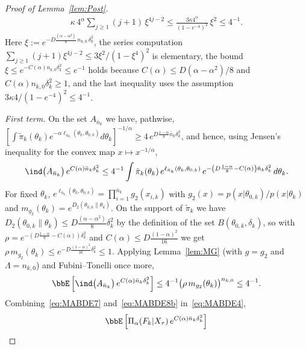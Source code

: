 \documentclass[11pt]{article}
\begin{document}
\begin{proof}[Proof of Lemma~\ref{lem:Post}]
\begin{align}
    \kappa\, 4^{\alpha}\sum_{j\geq 1} (j+1)\, \xi^{4j-2} \leq \frac{3\kappa 4^{\alpha}}{(1-e^{-4})^2}\, \xi^{2} \leq 4^{-1}.
    \label{eq:MABDE7}
\end{align}
Here $\xi := e^{-D \frac{(\alpha-\alpha^2)}{8}\, n_{k,0}\, \delta_k^2 }$, the series computation $\sum_{j\geq 1}(j+1)\xi^{4j-2} \leq 3 \xi^2/(1-\xi^4)^2$ is elementary, the bound $\xi \leq e^{-C(\alpha) n_{k,0} \delta_k^2} \leq e^{-1}$ holds because $C(\alpha) \leq D(\alpha-\alpha^2)/8$ and $C(\alpha) n_{k,0} \delta_k^2 \geq 1$, and the last inequality uses the assumption $3\kappa 4/(1-e^{-4})^2 \leq 4^{-1}$.

\emph{First term.} On the set $A_{\bar n_k}$ we have, pathwise, $\left[ \int \tilde \pi_k(\theta_k) e^{-\alpha \ell_{\bar n_k}(\theta_k,\theta_{0,k})} d\theta_k \right]^{-1/\alpha} \geq 4\, e^{ D \frac{1-\alpha}{8} \bar n_k \delta_k^2 }$, and hence, using Jensen's inequality for the convex map $x \mapsto x^{-1/\alpha}$,
\begin{align}
    \ind\big(A_{\bar n_k}\big)\, e^{C(\alpha) \bar n_k \delta_k^2} \leq 4^{-1} \int \tilde \pi_k(\theta_k)\, e^{\ell_{\bar n_k}(\theta_k,\theta_{0,k})}\, e^{ -\left(D \frac{1-\alpha}{8} - C(\alpha)\right) \bar n_k \delta_k^2 }\, d\theta_k.
    \label{eq:MABDE8}
\end{align}
For fixed $\theta_k$, $e^{\ell_{\bar n_k}(\theta_k,\theta_{0,k})} = \prod_{i=1}^{\bar n_k} g_2(x_{i,k})$ with $g_2(x) = p(x|\theta_{0,k})/p(x|\theta_k)$ and $m_{g_2}(\theta_k) = e^{D_2 \left( {\theta_{0,k}}\| {\theta_k} \right)}$. On the support of $\tilde \pi_k$ we have $D_2 \left( {\theta_{0,k}}\| {\theta_k} \right) \leq D \frac{(\alpha-\alpha^2)}{8} \delta_k^2$ by the definition of the set $B\left(\theta_{0,k},\delta_k \right)$, so with $\rho = e^{-\left(D \frac{1-\alpha}{8} - C(\alpha)\right)\delta_k^2}$ and $C(\alpha) \leq D\frac{(1-\alpha)^2}{16}$ we get $\rho\, m_{g_2}(\theta_k) \leq e^{-D \frac{(1-\alpha)^2}{16}\delta_k^2} \leq 1$. Applying Lemma~\ref{lem:MG} (with $g = g_2$ and $\Lambda = n_{k,0}$) and Fubini--Tonelli once more,
\begin{align}
    \bbE\left[\ind\big(A_{\bar n_k}\big)\, e^{C(\alpha) \bar n_k \delta_k^2}\right] \leq 4^{-1} \big(\rho\, m_{g_2}(\theta_k)\big)^{n_{k,0}} \leq 4^{-1}.
    \label{eq:MABDE8b}
\end{align}
Combining~\eqref{eq:MABDE7} and~\eqref{eq:MABDE8b} in~\eqref{eq:MABDE4},
\begin{align}
    \bbE\left[\Pi_{\alpha}(F_k|X_{\tau})\, e^{C(\alpha) \bar n_k \delta_k^2}\right]

\end{align}
\end{proof}
\end{document}
